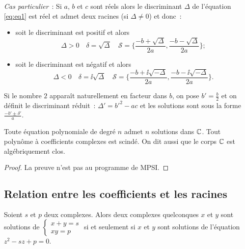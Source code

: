 \emph{Cas particulier}~: Si \(a\), \(b\) et \(c\) sont réels alors le 
discriminant \(\Delta\) de l'équation \eqref{eq:eq1} est réel et admet deux 
racines (si \(\Delta \neq 0\)) et donc~:
\begin{itemize}
  \item soit le discriminant est positif et alors
    \begin{equation}
      \Delta >0 \quad \delta = \sqrt{\Delta} \quad \mathcal{S} = 
      \biggl\lbrace \frac{-b + \sqrt{\Delta}}{2a} , 
      \frac{-b-\sqrt{\Delta}}{2a} \biggl\rbrace;
    \end{equation}
  \item soit le discriminant est négatif et alors
    \begin{equation}
      \Delta <0 \quad \delta = \ii\sqrt{\Delta} \quad \mathcal{S} = 
      \biggl\lbrace \frac{-b + \ii\sqrt{-\Delta}}{2a} , 
      \frac{-b-\ii\sqrt{-\Delta}}{2a} \biggl\rbrace.
    \end{equation}
\end{itemize}

Si le nombre \(2\) apparaît naturellement en facteur dans \(b\), on pose 
\(b' = \frac{b}{2}\) et on définit le discriminant réduit~: \(\Delta' = 
b'^2-ac\) et les solutions sont sous la forme \(\frac{-b'\pm \delta'}{a}\).

\begin{theo}
  Toute équation polynomiale de degré \(n\) admet \(n\) solutions dans \(\mathbb{C}\).  
  Tout polynôme à coefficients complexes est scindé. On dit aussi que le corps 
  \(\mathbb{C}\) est algébriquement clos.
\end{theo}

\begin{proof}
  La preuve n'est pas au programme de MPSI.
\end{proof}

\subsection{Relation entre les coefficients et les racines}
\label{subsec:relationcoefsracines}

\begin{prop}
  Soient \(s\) et \(p\) deux complexes. Alors deux complexes quelconques \(x\) 
  et \(y\) sont solutions de \(\begin{cases} x  + y = s \\ xy = p 
  \end{cases}\) si et seulement si \(x\) et \(y\) sont solutions de l'équation 
  \(z^2 -sz + p = 0\).
\end{prop}

